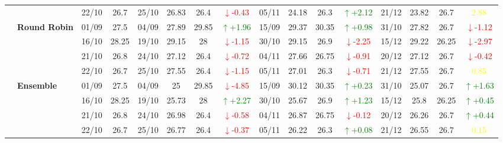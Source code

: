\documentclass{ieeeaccess}
\begin{document}
{\begin{longtable}{llcc|cccc|cccc|cccc}
&
& 22/10 & 26.7 & 25/10 & 26.83 & 26.4 & \textcolor{red}{\(\downarrow\)-0.43} & 05/11 & 24.18 & 26.3 & \textcolor{green}{\(\uparrow\)+2.12} & 21/12 & 23.82 & 26.7 & \textcolor{yellow}{2.88} \\
\cmidrule(lr){2-16}


& \textbf{Round Robin}
& 01/09 & 27.5 & 04/09 & 27.89 & 29.85 & \textcolor{green}{\(\uparrow\)+1.96} & 15/09 & 29.37 & 30.35 & \textcolor{green}{\(\uparrow\)+0.98} & 31/10 & 27.82 & 26.7 & \textcolor{red}{\(\downarrow\)-1.12} \\

& 
& 16/10 & 28.25 & 19/10 & 29.15 & 28 & \textcolor{red}{\(\downarrow\)-1.15} & 30/10 & 29.15 & 26.9 & \textcolor{red}{\(\downarrow\)-2.25} & 15/12 & 29.22 & 26.25 & \textcolor{red}{\(\downarrow\)-2.97} \\

& 
& 21/10 & 26.8 & 24/10 & 27.12 & 26.4 & \textcolor{red}{\(\downarrow\)-0.72} & 04/11 & 27.66 & 26.75 & \textcolor{red}{\(\downarrow\)-0.91} & 20/12 & 27.12 & 26.7 & \textcolor{red}{\(\downarrow\)-0.42} \\

&
& 22/10 & 26.7 & 25/10 & 27.55 & 26.4 & \textcolor{red}{\(\downarrow\)-1.15} & 05/11 & 27.01 & 26.3 & \textcolor{red}{\(\downarrow\)-0.71} & 21/12 & 27.55 & 26.7 & \textcolor{yellow}{0.85} \\
\cmidrule(lr){2-16}


& \textbf{Ensemble}
& 01/09 & 27.5 & 04/09 & 25 & 29.85& \textcolor{red}{\(\downarrow\)-4.85} & 15/09 & 30.12 & 30.35 & \textcolor{green}{\(\uparrow\)+0.23} & 31/10 & 25.07 & 26.7 & \textcolor{green}{\(\uparrow\)+1.63} \\

& 
& 16/10 & 28.25 & 19/10 & 25.73 & 28 & \textcolor{green}{\(\uparrow\)+2.27} & 30/10 & 25.67 & 26.9 & \textcolor{green}{\(\uparrow\)+1.23} & 15/12 & 25.8 & 26.25 & \textcolor{green}{\(\uparrow\)+0.45} \\

& 
& 21/10 & 26.8 & 24/10 & 26.98 & 26.4 & \textcolor{red}{\(\downarrow\)-0.58} & 04/11 & 26.87 & 26.75 & \textcolor{red}{\(\downarrow\)-0.12} & 20/12 & 26.26 & 26.7 & \textcolor{green}{\(\uparrow\)+0.44} \\

&
& 22/10 & 26.7 & 25/10 & 26.77 & 26.4 & \textcolor{red}{\(\downarrow\)-0.37} & 05/11 & 26.22 & 26.3 & \textcolor{green}{\(\uparrow\)+0.08} & 21/12 & 26.55 & 26.7 & \textcolor{yellow}{0.15} \\
\midrule




\end{longtable}}
\end{document}
